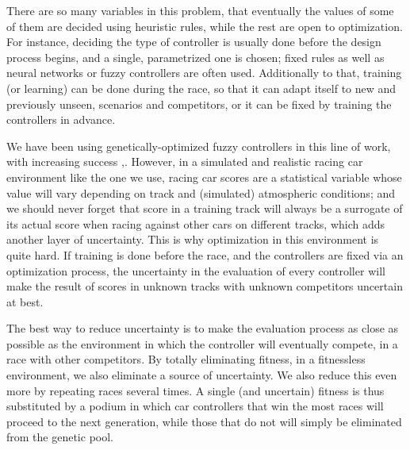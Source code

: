 \documentclass[10pt,journal,compsoc]{IEEEtran}
\begin{document}
There are so many variables in this problem, that eventually the values of some of
them are decided using heuristic rules, while the rest are open to
optimization. For instance, deciding the type of controller is usually
done before the design process begins, and a single, parametrized one
is chosen; fixed rules as well as neural networks \cite{KIM201287} or fuzzy controllers \cite{PerezEvolvingFuzzy09} are often used. 
Additionally to that, training (or learning) \cite{Loiacono:2012:LEA:2212908.2212953} can be done during the
race, so that it can adapt itself to new and previously unseen,
scenarios and competitors, or it can be fixed by training the
controllers in advance. 

We have been using genetically-optimized fuzzy controllers in this line of work, with increasing success \cite{salem_evo17},\cite{salem_evo18}.
However, in a simulated and realistic racing car environment like the one we use, racing car scores are a
    statistical variable whose value will vary depending on track and
    (simulated) atmospheric conditions; and we should never forget
    that score in a training track will always be a surrogate of its
    actual score when racing against other cars on different tracks,
    which adds another layer of uncertainty. This is why optimization
    in this environment is quite hard. If training is done before the
    race, and the controllers are fixed via an optimization process,
    the uncertainty in the evaluation of every controller will make
    the result of scores in unknown tracks with unknown competitors
    uncertain at best.

The best way to reduce uncertainty is to make the evaluation process
as close as possible as the environment in which the controller will
eventually compete, in a race with other competitors. By totally
eliminating fitness, in a fitnessless environment, we also eliminate
a source of uncertainty. We also reduce this even more by repeating
races several times. A single (and uncertain) fitness is thus
substituted by a podium in which car controllers that win the most
races will proceed to the next generation, while those that do not
will simply be eliminated from the genetic pool. 
\end{document}
